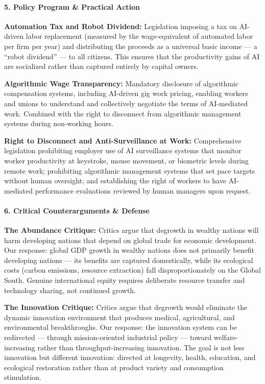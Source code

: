 \paragraph{5. Policy Program \& Practical
Action}\label{policy-program-practical-action-6}

\textbf{Automation Tax and Robot Dividend:} Legislation imposing a tax
on AI-driven labor replacement (measured by the wage-equivalent of
automated labor per firm per year) and distributing the proceeds as a
universal basic income --- a ``robot dividend'' --- to all citizens.
This ensures that the productivity gains of AI are socialized rather
than captured entirely by capital owners.

\textbf{Algorithmic Wage Transparency:} Mandatory disclosure of
algorithmic compensation systems, including AI-driven gig work pricing,
enabling workers and unions to understand and collectively negotiate the
terms of AI-mediated work. Combined with the right to disconnect from
algorithmic management systems during non-working hours.

\textbf{Right to Disconnect and Anti-Surveillance at Work:}
Comprehensive legislation prohibiting employer use of AI surveillance
systems that monitor worker productivity at keystroke, mouse movement,
or biometric levels during remote work; prohibiting algorithmic
management systems that set pace targets without human oversight; and
establishing the right of workers to have AI-mediated performance
evaluations reviewed by human managers upon request.

\paragraph{6. Critical Counterarguments \&
Defense}\label{critical-counterarguments-defense-6}

\textbf{The Abundance Critique:} Critics argue that degrowth in wealthy
nations will harm developing nations that depend on global trade for
economic development. Our response: global GDP growth in wealthy nations
does not primarily benefit developing nations --- its benefits are
captured domestically, while its ecological costs (carbon emissions,
resource extraction) fall disproportionately on the Global South.
Genuine international equity requires deliberate resource transfer and
technology sharing, not continued growth.

\textbf{The Innovation Critique:} Critics argue that degrowth would
eliminate the dynamic innovation environment that produces medical,
agricultural, and environmental breakthroughs. Our response: the
innovation system can be redirected --- through mission-oriented
industrial policy --- toward welfare-increasing rather than
throughput-increasing innovation. The goal is not less innovation but
different innovation: directed at longevity, health, education, and
ecological restoration rather than at product variety and consumption
stimulation.

